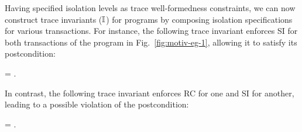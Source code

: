 Having specified isolation levels as trace well-formedness
constraints, we can now construct trace invariants ($\mathbb{I}$) for \txnimp
programs by composing isolation specifications for various
transactions. For instance, the following trace invariant enforces SI
for both transactions of the program in Fig.~\ref{fig:motiv-eg-1},
allowing it to satisfy its postcondition:
\begin{smathpar}
\I \;=\; \lambda\E.~  \conj {}
\end{smathpar}
In contrast, the following trace invariant enforces RC for one and SI
for another, leading to a possible violation of the postcondition:
\begin{smathpar}
\I \;=\; \lambda\E.~  \conj {}
\end{smathpar}
